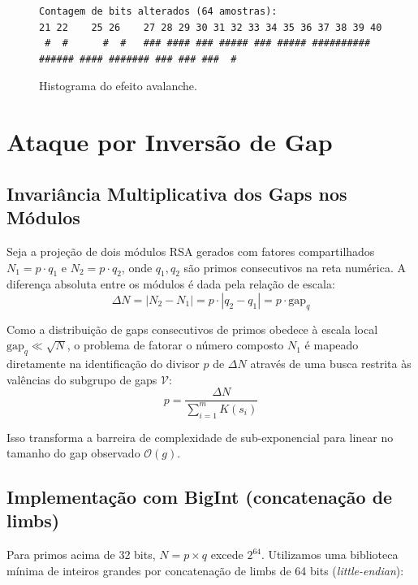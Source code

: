 \documentclass[12pt,a4paper]{article}
\theoremstyle{plain}
\begin{document}
\begin{figure}[htbp]
\centering
\begin{minipage}{0.7\textwidth}
\centering
\vspace{0.5cm}
{\footnotesize
\begin{verbatim}
Contagem de bits alterados (64 amostras):
21 22    25 26    27 28 29 30 31 32 33 34 35 36 37 38 39 40
 #  #      #  #   ### #### ### ##### ### ##### ########## ###### #### ####### ### ### ###  #
\end{verbatim}
}
\caption{Histograma do efeito avalanche.}
\label{fig:hist_avalanche}
\end{minipage}
\end{figure}

\section{Ataque por Inversão de Gap}
\label{sec:gap_inversion}

\subsection{Invariância Multiplicativa dos Gaps nos Módulos}

Seja a projeção de dois módulos RSA gerados com fatores compartilhados
$N_1 = p \cdot q_1$ e $N_2 = p \cdot q_2$, onde $q_1, q_2$ são primos
consecutivos na reta numérica.  A diferença absoluta entre os módulos
é dada pela relação de escala:
\[
\Delta N = |N_2 - N_1| = p \cdot |q_2 - q_1| = p \cdot \text{gap}_q
\]

Como a distribuição de gaps consecutivos de primos obedece à escala
local $\text{gap}_q \ll \sqrt{N}$, o problema de fatorar o número
composto $N_1$ é mapeado diretamente na identificação do divisor $p$
de $\Delta N$ através de uma busca restrita às valências do subgrupo
de gaps $\mathcal{V}$:
\[
p = \frac{\Delta N}{\sum_{i=1}^{m} K(s_i)}
\]

Isso transforma a barreira de complexidade de sub-exponencial para
linear no tamanho do gap observado $\mathcal{O}(g)$.

\subsection{Implementação com BigInt (concatenação de limbs)}

Para primos acima de 32 bits, $N = p \times q$ excede $2^{64}$.
Utilizamos uma biblioteca mínima de inteiros grandes por concatenação
de limbs de 64 bits (\emph{little-endian}):
\end{document}

